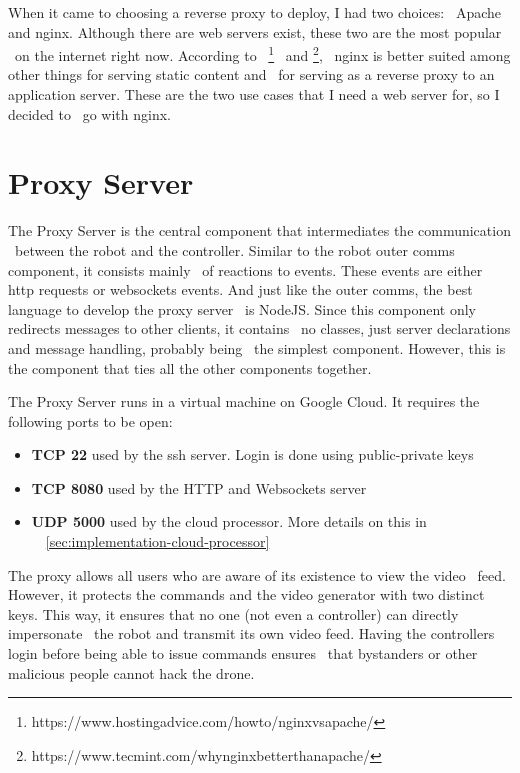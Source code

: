 When it came to choosing a reverse proxy to deploy, I had two choices: \
Apache and nginx.
Although there are web servers exist, these two are the most popular \
on the internet right now.
According to \
\footnote{https://www.hostingadvice.com/how\-to/nginx\-vs\-apache/} \
and \footnote{https://www.tecmint.com/why\-nginx\-better\-than\-apache/}, \
nginx is better suited among other things for serving static content and \
for serving as a reverse proxy to an application server.
These are the two use cases that I need a web server for, so I decided to \
go with nginx.



\section{Proxy Server}
\label{sec:implementation-proxy-server}
The Proxy Server is the central component that intermediates the communication \
between the robot and the controller.
Similar to the robot outer comms component, it consists mainly \
of reactions to events.
These events are either http requests or websockets events.
And just like the outer comms, the best language to develop the proxy server \
is NodeJS.
Since this component only redirects messages to other clients, it contains \
no classes, just server declarations and message handling, probably being \
the simplest component.
However, this is the component that ties all the other components together.

The Proxy Server runs in a virtual machine on Google Cloud.
It requires the following ports to be open:
\begin{itemize}
    \item \textbf{TCP 22} used by the ssh server. Login is done using public-private keys
    \item \textbf{TCP 8080} used by the HTTP and Websockets server
    \item \textbf{UDP 5000} used by the cloud processor. More details on this in \
            ~\ref{sec:implementation-cloud-processor}
\end{itemize}

The proxy allows all users who are aware of its existence to view the video \
feed.
However, it protects the commands and the video generator with two distinct keys.
This way, it ensures that no one (not even a controller) can directly impersonate \
the robot and transmit its own video feed.
Having the controllers login before being able to issue commands ensures \
that bystanders or other malicious people cannot hack the drone.

